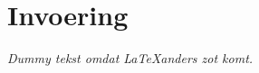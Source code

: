 \documentclass[verslag.tex]{subfiles}
\begin{document}
\part{Invoering}
\label{invoering}

\textit{Dummy tekst omdat \LaTeX anders zot komt.}
\end{document}
